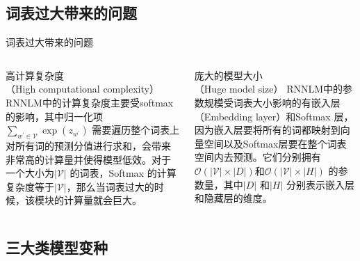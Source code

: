 \documentclass[14pt]{Bredelebeamer}
\begin{document}
\subsection{词表过大带来的问题}
\begin{frame}{词表过大带来的问题}
    \begin{columns}
    \begin{column}{.5\textwidth}
        \begin{block}{高计算复杂度\\（High computational complexity）}
        RNNLM中的计算复杂度主要受softmax的影响，其中归一化项${\sum_{w^{'}\in\mathcal{V}} {\exp(z_{w^{'}})}}$ 需要遍历整个词表上对所有词的预测分值进行求和，会带来非常高的计算量并使得模型低效。对于一个大小为${|\mathcal{V}|}$ 的词表，Softmax 的计算复杂度等于${\mathcal{|\mathcal{V}|}}$，那么当词表过大的时候，该模块的计算量就会巨大。

        \end{block}
    \end{column}
    \begin{column}{0.5\textwidth}
        \begin{block}{庞大的模型大小\\（Huge model size）}
        RNNLM中的参数规模受词表大小影响的有嵌入层（Embedding layer）和Softmax 层，因为嵌入层要将所有的词都映射到向量空间以及Softmax层要在整个词表空间内去预测。它们分别拥有${\mathcal{O}(|\mathcal{V}| \times |D|)}$和${\mathcal{O}(|\mathcal{V}| \times |H|)}$ 的参数量，其中$|D|$ 和$|H|$ 分别表示嵌入层和隐藏层的维度。

        \end{block}
    \end{column}
    \end{columns}
\end{frame}

\subsection{三大类模型变种}
\end{document}
